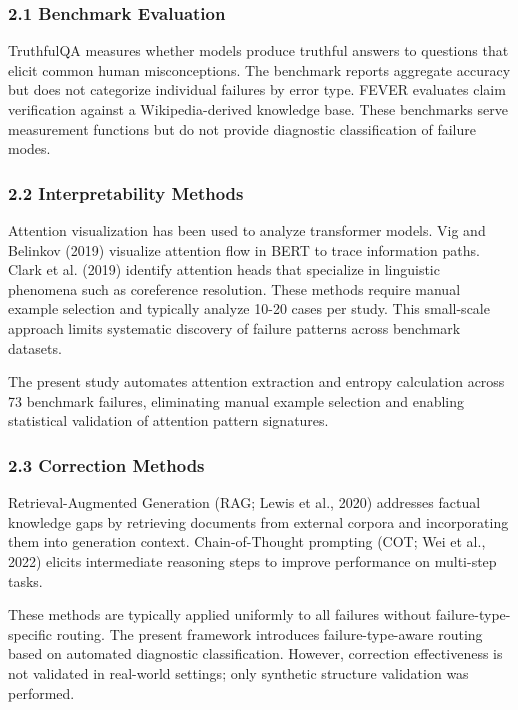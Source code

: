 
\subsubsection{2.1 Benchmark Evaluation}

TruthfulQA \citep{Lin2021TruthfulQA} measures whether models produce truthful answers to questions that elicit common human misconceptions. The benchmark reports aggregate accuracy but does not categorize individual failures by error type. FEVER \citep{Thorne2018FEVER} evaluates claim verification against a Wikipedia-derived knowledge base. These benchmarks serve measurement functions but do not provide diagnostic classification of failure modes.

\subsubsection{2.2 Interpretability Methods}

Attention visualization has been used to analyze transformer models. Vig and Belinkov (2019) visualize attention flow in BERT to trace information paths. Clark et al. (2019) identify attention heads that specialize in linguistic phenomena such as coreference resolution. These methods require manual example selection and typically analyze 10-20 cases per study. This small-scale approach limits systematic discovery of failure patterns across benchmark datasets.

The present study automates attention extraction and entropy calculation across 73 benchmark failures, eliminating manual example selection and enabling statistical validation of attention pattern signatures.

\subsubsection{2.3 Correction Methods}

Retrieval-Augmented Generation (RAG; Lewis et al., 2020) addresses factual knowledge gaps by retrieving documents from external corpora and incorporating them into generation context. Chain-of-Thought prompting (COT; Wei et al., 2022) elicits intermediate reasoning steps to improve performance on multi-step tasks.

These methods are typically applied uniformly to all failures without failure-type-specific routing. The present framework introduces failure-type-aware routing based on automated diagnostic classification. However, correction effectiveness is not validated in real-world settings; only synthetic structure validation was performed.
